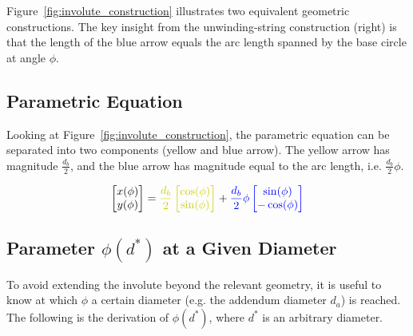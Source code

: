 Figure~\ref{fig:involute_construction} illustrates two equivalent geometric constructions. The key insight from the unwinding-string construction (right) is that the length of the blue arrow equals the arc length spanned by the base circle at angle $\phi$.

\subsection{Parametric Equation}
Looking at Figure~\ref{fig:involute_construction}, the parametric equation can be separated into two components (yellow and blue arrow). The yellow arrow has magnitude $\frac{d_b}{2}$, and the blue arrow has magnitude equal to the arc length, i.e. $\frac{d_b}{2}\phi$.

\begin{equation}
    \begin{bmatrix}
        x(\phi) \\
        y(\phi)
    \end{bmatrix}
    = \textcolor[rgb]{0.8,0.8,0}{
        \frac{d_b}{2}
        \begin{bmatrix}
            \cos(\phi) \\
            \sin(\phi)
        \end{bmatrix}}
    + \textcolor{blue}{
        \frac{d_b}{2}\phi
        \begin{bmatrix}
            \sin(\phi) \\
            -\cos(\phi)
        \end{bmatrix}}
\end{equation}

\subsection{Parameter \texorpdfstring{$\phi(d^*)$}{φ(d*)} at a Given Diameter}
To avoid extending the involute beyond the relevant geometry, it is useful to know at which $\phi$ a certain diameter (e.g. the addendum diameter $d_a$) is reached. The following is the derivation of $\phi(d^*)$, where $d^*$ is an arbitrary diameter.

